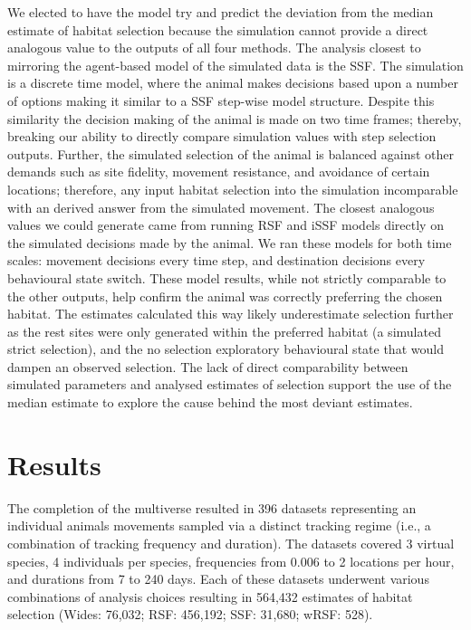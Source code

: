 \documentclass[10pt,a4paper]{article}
\begin{document}
We elected to have the model try and predict the deviation from the median estimate of habitat selection because the simulation cannot provide a direct analogous value to the outputs of all four methods.
The analysis closest to mirroring the agent-based model of the simulated data is the SSF.
The simulation is a discrete time model, where the animal makes decisions based upon a number of options making it similar to a SSF step-wise model structure.
Despite this similarity the decision making of the animal is made on two time frames; thereby, breaking our ability to directly compare simulation values with step selection outputs.
Further, the simulated selection of the animal is balanced against other demands such as site fidelity, movement resistance, and avoidance of certain locations; therefore, any input habitat selection into the simulation incomparable with an derived answer from the simulated movement.
The closest analogous values we could generate came from running RSF and iSSF models directly on the simulated decisions made by the animal.
We ran these models for both time scales: movement decisions every time step, and destination decisions every behavioural state switch.
These model results, while not strictly comparable to the other outputs, help confirm the animal was correctly preferring the chosen habitat.
The estimates calculated this way likely underestimate selection further as the rest sites were only generated within the preferred habitat (a simulated strict selection), and the no selection exploratory behavioural state that would dampen an observed selection.
The lack of direct comparability between simulated parameters and analysed estimates of selection support the use of the median estimate to explore the cause behind the most deviant estimates.

\hypertarget{results}{%
\section{Results}\label{results}}

The completion of the multiverse resulted in 396 datasets representing an individual animals movements sampled via a distinct tracking regime (i.e., a combination of tracking frequency and duration).
The datasets covered 3 virtual species, 4 individuals per species, frequencies from 0.006 to 2 locations per hour, and durations from 7 to 240 days.
Each of these datasets underwent various combinations of analysis choices resulting in
564,432 estimates of habitat selection (Wides: 76,032; RSF: 456,192; SSF: 31,680; wRSF: 528).
\end{document}
